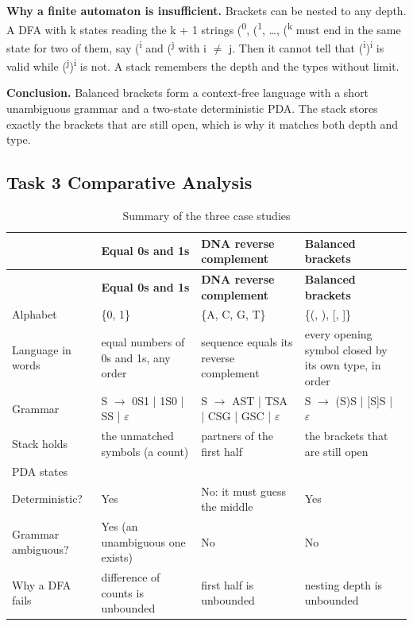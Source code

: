 \documentclass[12pt,a4paper]{article}
\begin{document}
\textbf{Why a finite automaton is insufficient.} Brackets can be nested to any depth. A DFA with k states reading the k + 1 strings (\textsuperscript{0}, (\textsuperscript{1}, \ldots{}, (\textsuperscript{k} must end in the same state for two of them, say (\textsuperscript{i} and (\textsuperscript{j} with i \ensuremath{\neq} j. Then it cannot tell that (\textsuperscript{i})\textsuperscript{i} is valid while (\textsuperscript{j})\textsuperscript{i} is not. A stack remembers the depth and the types without limit.

\textbf{Conclusion.} Balanced brackets form a context-free language with a short unambiguous grammar and a two-state deterministic PDA. The stack stores exactly the brackets that are still open, which is why it matches both depth and type.

\subsection{Task 3 Comparative Analysis}

{\footnotesize
\begin{longtable}{|>{\raggedright\arraybackslash}p{}|>{\raggedright\arraybackslash}p{}|>{\raggedright\arraybackslash}p{}|>{\raggedright\arraybackslash}p{}|}
\caption[Summary of the three case studies]{Summary of the three case studies}\label{tab:t3_compare}\\
\hline
\rowcolor{hdr} & \textbf{Equal 0s and 1s} & \textbf{DNA reverse complement} & \textbf{Balanced brackets}\\ \hline
\endfirsthead
\hline
\rowcolor{hdr} & \textbf{Equal 0s and 1s} & \textbf{DNA reverse complement} & \textbf{Balanced brackets}\\ \hline
\endhead
Alphabet & \{0, 1\} & \{A, C, G, T\} & \{(, ), [, ]\}\\ \hline
Language in words & equal numbers of 0s and 1s, any order & sequence equals its reverse complement & every opening symbol closed by its own type, in order\\ \hline
Grammar & S \ensuremath{\rightarrow} 0S1 | 1S0 | SS | \ensuremath{\varepsilon} & S \ensuremath{\rightarrow} AST | TSA | CSG | GSC | \ensuremath{\varepsilon} & S \ensuremath{\rightarrow} (S)S | [S]S | \ensuremath{\varepsilon}\\ \hline
Stack holds & the unmatched symbols (a count) & partners of the first half & the brackets that are still open\\ \hline
PDA states & 2 & 3 & 2\\ \hline
Deterministic? & Yes & No: it must guess the middle & Yes\\ \hline
Grammar ambiguous? & Yes (an unambiguous one exists) & No & No\\ \hline
Why a DFA fails & difference of counts is unbounded & first half is unbounded & nesting depth is unbounded\\ \hline
\end{longtable}}
\end{document}
